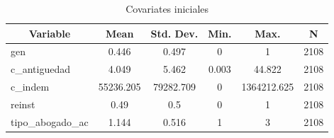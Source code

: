 
\begin{table}[htbp]\centering \caption{Covariates iniciales \label{sumstat}}
\begin{tabular}{l c c c c c}\hline\hline
\multicolumn{1}{c}{\textbf{Variable}} & \textbf{Mean}
 & \textbf{Std. Dev.}& \textbf{Min.} &  \textbf{Max.} & \textbf{N}\\ \hline
gen & 0.446 & 0.497 & 0 & 1 & 2108\\
c\_antiguedad & 4.049 & 5.462 & 0.003 & 44.822 & 2108\\
c\_indem & 55236.205 & 79282.709 & 0 & 1364212.625 & 2108\\
reinst & 0.49 & 0.5 & 0 & 1 & 2108\\
tipo\_abogado\_ac & 1.144 & 0.516 & 1 & 3 & 2108\\
\hline\end{tabular}
\end{table}
